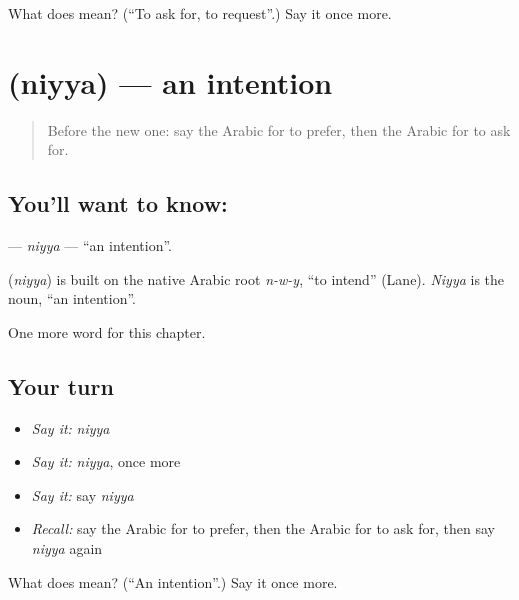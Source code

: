 \begin{tcolorbox}[breakable,colback=teal!4,colframe=teal!35!black,title={Before you move on}]
What does  mean? (\textquotedblleft{}To ask for, to request\textquotedblright{}.) Say it once more.
\end{tcolorbox}
\section[\texorpdfstring{\ar{نية} (niyya)}{نية (niyya)}]{ (niyya) — an intention}

\label{lesson:AR-C115-niyya}



\begin{quote}
Before the new one: say the Arabic for to prefer, then the Arabic for to ask for.
\end{quote}

\subsection*{You'll want to know: }
\textbf{} — \emph{niyya} — \textquotedblleft{}an intention\textquotedblright{}.

\begin{cousinweb}
\textbf{} (\emph{niyya}) is built on the native Arabic root \emph{n-w-y}, \textquotedblleft{}to intend\textquotedblright{} (Lane). \emph{Niyya} is the noun, \textquotedblleft{}an intention\textquotedblright{}.
\end{cousinweb}

\begin{grammarlens}[title={What you've built}]
One more word for this chapter.
\end{grammarlens}

\subsection*{Your turn}
\begin{itemize}
\raggedright
  \item \emph{Say it:} \emph{niyya}
  \item \emph{Say it:} \emph{niyya}, once more
  \item \emph{Say it:} say \emph{niyya}
  \item \emph{Recall:} say the Arabic for to prefer, then the Arabic for to ask for, then say \emph{niyya} again
\end{itemize}

\begin{tcolorbox}[breakable,colback=teal!4,colframe=teal!35!black,title={Before you move on}]
What does  mean? (\textquotedblleft{}An intention\textquotedblright{}.) Say it once more.
\end{tcolorbox}
